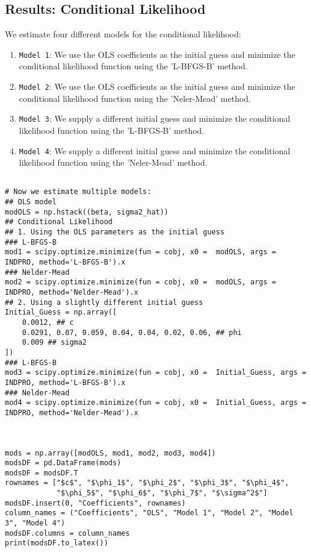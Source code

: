 \documentclass{article}
\begin{document}
\subsection{Results: Conditional Likelihood}
We estimate four different models for the conditional likelihood:
\begin{enumerate}
\item \texttt{Model 1}: We use the OLS coefficients as the initial guess and minimize the conditional likelihood function using the 'L-BFGS-B' method.
\item \texttt{Model 2}: We use the OLS coefficients as the initial guess and minimize the conditional likelihood function using the 'Neler-Mead' method.
\item \texttt{Model 3}: We supply a different initial guess and minimize the conditional likelihood function using the 'L-BFGS-B' method.
\item \texttt{Model 4}: We supply a different initial guess and minimize the conditional likelihood function using the  'Neler-Mead' method.
\end{enumerate}

\begin{verbatim}

# Now we estimate multiple models:
## OLS model
modOLS = np.hstack((beta, sigma2_hat))
## Conditional Likelihood
## 1. Using the OLS parameters as the initial guess
### L-BFGS-B
mod1 = scipy.optimize.minimize(fun = cobj, x0 =  modOLS, args = INDPRO, method='L-BFGS-B').x
### Nelder-Mead
mod2 = scipy.optimize.minimize(fun = cobj, x0 =  modOLS, args = INDPRO, method='Nelder-Mead').x
## 2. Using a slightly different initial guess
Initial_Guess = np.array([
    0.0012, ## c
    0.0291, 0.07, 0.059, 0.04, 0.04, 0.02, 0.06, ## phi
    0.009 ## sigma2 
])
### L-BFGS-B
mod3 = scipy.optimize.minimize(fun = cobj, x0 =  Initial_Guess, args = INDPRO, method='L-BFGS-B').x
### Nelder-Mead
mod4 = scipy.optimize.minimize(fun = cobj, x0 =  Initial_Guess, args = INDPRO, method='Nelder-Mead').x



mods = np.array([modOLS, mod1, mod2, mod3, mod4])
modsDF = pd.DataFrame(mods)
modsDF = modsDF.T
rownames = ["$c$", "$\phi_1$", "$\phi_2$", "$\phi_3$", "$\phi_4$", 
            "$\phi_5$", "$\phi_6$", "$\phi_7$", "$\sigma^2$"]
modsDF.insert(0, "Coefficients", rownames)
column_names = ("Coefficients", "OLS", "Model 1", "Model 2", "Model 3", "Model 4")
modsDF.columns = column_names
print(modsDF.to_latex())
\end{verbatim}
\end{document}
